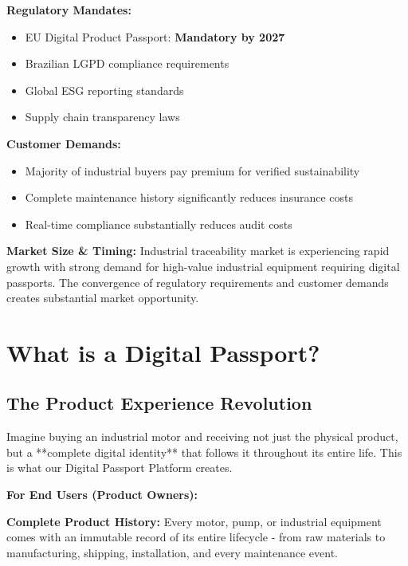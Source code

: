 \documentclass[11pt,a4paper]{article}
\begin{document}
\begin{multicols}{2}
\textbf{Regulatory Mandates:}
\begin{itemize}[leftmargin=0.3cm]
    \item EU Digital Product Passport: \textbf{Mandatory by 2027}
    \item Brazilian LGPD compliance requirements
    \item Global ESG reporting standards
    \item Supply chain transparency laws
\end{itemize}

\textbf{Customer Demands:}
\begin{itemize}[leftmargin=0.3cm]
    \item Majority of industrial buyers pay premium for verified sustainability
    \item Complete maintenance history significantly reduces insurance costs
    \item Real-time compliance substantially reduces audit costs
\end{itemize}
\end{multicols}

\textbf{Market Size \& Timing:}
Industrial traceability market is experiencing rapid growth with strong demand for high-value industrial equipment requiring digital passports. The convergence of regulatory requirements and customer demands creates substantial market opportunity.

\section{What is a Digital Passport?}

\subsection{The Product Experience Revolution}

Imagine buying an industrial motor and receiving not just the physical product, but a **complete digital identity** that follows it throughout its entire life. This is what our Digital Passport Platform creates.

\textbf{For End Users (Product Owners):}

\textbf{Complete Product History:} Every motor, pump, or industrial equipment comes with an immutable record of its entire lifecycle - from raw materials to manufacturing, shipping, installation, and every maintenance event.
\end{document}
